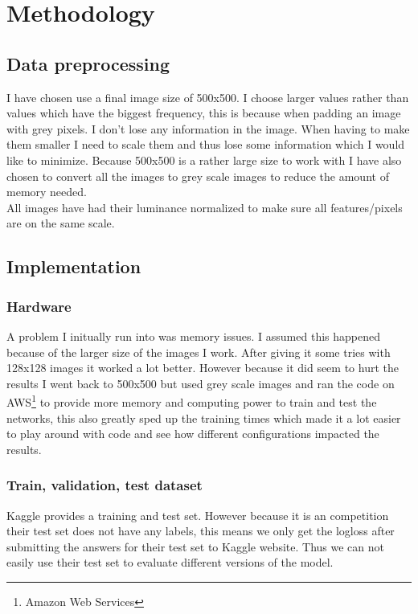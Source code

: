 \documentclass[11pt]{article}
\begin{document}
\section{Methodology}
\subsection{Data preprocessing}
I have chosen use a final image size of 500x500. I choose larger values rather than values which have the biggest frequency, this is because when padding an image with grey pixels. I don't lose any information in the image. When having to make them smaller I need to scale them and thus lose some information which I would like to minimize. Because 500x500 is a rather large size to work with I have also chosen to convert all the images to grey scale images to reduce the amount of memory needed.\\
All images have had their luminance normalized to make sure all features/pixels are on the same scale.

\subsection{Implementation}
\subsubsection{Hardware}
A problem I initually run into was memory issues. I assumed this happened because of the larger size of the images I work. After giving it some tries with 128x128 images it worked a lot better. However because it did seem to hurt the results I went back to 500x500 but used grey scale images and ran the code on AWS\footnote{Amazon Web Services} to provide more memory and computing power to train and test the networks, this also greatly sped up the training times which made it a lot easier to play around with code and see how different configurations impacted the results.

\subsubsection{Train, validation, test dataset}
Kaggle provides a training and test set. However because it is an competition their test set does not have any labels, this means we only get the logloss after submitting the answers for their test set to Kaggle website. Thus we can not easily use their test set to evaluate different versions of the model.\\
\end{document}
